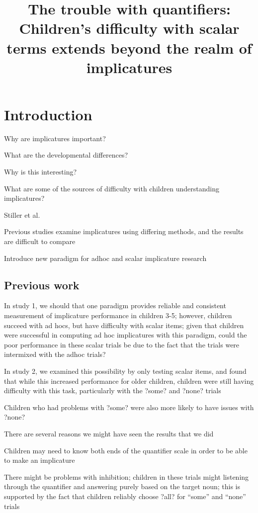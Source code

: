 \documentclass[man]{apa2}
\title{The trouble with quantifiers: Children's difficulty with scalar terms extends beyond the realm of implicatures}
\begin{document}
\maketitle               

\section{Introduction}
Why are implicatures important? 

What are the developmental differences?

Why is this interesting?

What are some of the sources of difficulty with children understanding implicatures? 

Stiller et al. 

Previous studies examine implicatures using differing methods, and the results are difficult to compare

Introduce new paradigm for adhoc and scalar implicature research 


\subsection{Previous work}

In study 1, we should that one paradigm provides reliable and consistent measurement of implicature performance in children 3-5; however, children succeed with ad hocs, but have difficulty with scalar items; given that children were successful in computing ad hoc implicatures with this paradigm, could the poor performance in these scalar trials be due to the fact that the trials were intermixed with the adhoc trials?

In study 2, we examined this possibility by only testing scalar items, and found that while this increased performance for older children, children were still having difficulty with this task, particularly with the ?some? and ?none? trials

Children who had problems with ?some? were also more likely to have issues with ?none? 

There are several reasons we might have seen the results that we did

Children may need to know both ends of the quantifier scale in order to be able to make an implicature

There might be problems with inhibition; children in these trials might listening through the quantifier and answering purely based on the target noun; this is supported by the fact that children reliably choose ?all? for ``some'' and ``none'' trials
\end{document}
